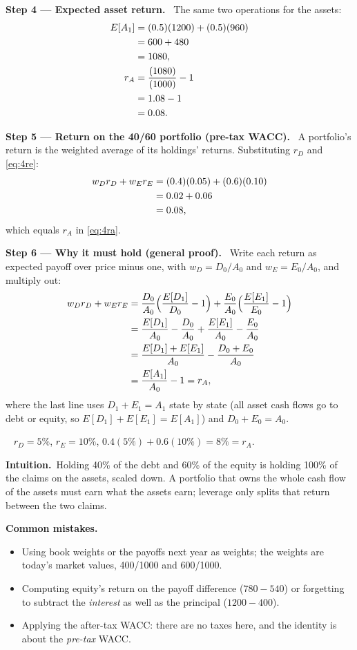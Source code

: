 \documentclass[11pt,a4paper]{article}
\numberwithin{equation}{section}
\newcommand{\step}[2]{\par\medskip\noindent\textbf{Step #1 --- #2.}~}
\newcommand{\intuition}[1]{\par\medskip\noindent\textbf{Intuition.}~#1}
\newcommand{\answer}[1]{\par\smallskip\noindent\fbox{\textbf{Answer #1.}}~}
\newcommand{\pitfalls}{\par\medskip\noindent\textbf{Common mistakes.}}
\begin{document}
\step{4}{Expected asset return} The same two operations for the assets:
\begin{align}
  E[A_1] &= (0.5)(1200) + (0.5)(960) \notag\\
         &= 600 + 480 \notag\\
         &= 1080, \notag\\
  r_A &= \frac{(1080)}{(1000)} - 1 \notag\\
      &= 1.08 - 1 \notag\\
      &= 0.08. \label{eq:4ra}
\end{align}

\step{5}{Return on the 40/60 portfolio (pre-tax WACC)} A portfolio's return is the
weighted average of its holdings' returns. Substituting $r_D$ and \eqref{eq:4re}:
\begin{align}
  w_D r_D + w_E r_E &= (0.4)(0.05) + (0.6)(0.10) \notag\\
                    &= 0.02 + 0.06 \notag\\
                    &= 0.08, \label{eq:4wacc}
\end{align}
which equals $r_A$ in \eqref{eq:4ra}.

\step{6}{Why it must hold (general proof)} Write each return as expected payoff over price minus
one, with $w_D=D_0/A_0$ and $w_E=E_0/A_0$, and multiply out:
\begin{align}
  w_D r_D + w_E r_E &= \frac{D_0}{A_0}\Big(\frac{E[D_1]}{D_0}-1\Big) + \frac{E_0}{A_0}\Big(\frac{E[E_1]}{E_0}-1\Big) \notag\\
  &= \frac{E[D_1]}{A_0} - \frac{D_0}{A_0} + \frac{E[E_1]}{A_0} - \frac{E_0}{A_0} \notag\\
  &= \frac{E[D_1]+E[E_1]}{A_0} - \frac{D_0+E_0}{A_0} \notag\\
  &= \frac{E[A_1]}{A_0} - 1 = r_A, \label{eq:4gen}
\end{align}
where the last line uses $D_1+E_1=A_1$ state by state (all asset cash flows go to debt or
equity, so $E[D_1]+E[E_1]=E[A_1]$) and $D_0+E_0=A_0$.

\answer{(proof)} $r_D=5\%$, $r_E=10\%$, $0.4(5\%)+0.6(10\%)=8\%=r_A$.

\intuition{Holding 40\% of the debt and 60\% of the equity is holding 100\% of the claims on the
assets, scaled down. A portfolio that owns the whole cash flow of the assets must earn what the
assets earn; leverage only splits that return between the two claims.}

\pitfalls
\begin{itemize}
  \item Using book weights or the payoffs next year as weights; the weights are today's market
        values, 400/1000 and 600/1000.
  \item Computing equity's return on the payoff difference ($780-540$) or forgetting to subtract
        the \emph{interest} as well as the principal ($1200-400$).
  \item Applying the after-tax WACC: there are no taxes here, and the identity is about the
        \emph{pre-tax} WACC.
\end{itemize}
\end{document}
